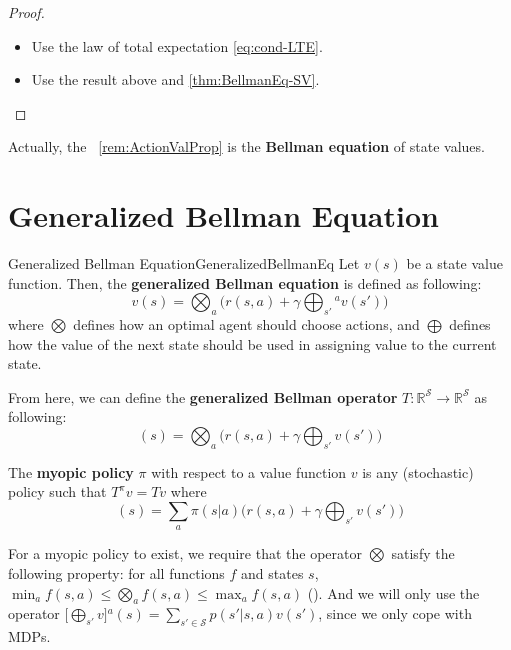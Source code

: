     \begin{proof}
        \begin{itemize}
            \item Use the law of total expectation \ref{eq:cond-LTE}.
            \item Use the result above and \ref{thm:BellmanEq-SV}.
        \end{itemize}
    \end{proof}
    Actually, the ~\ref{rem:ActionValProp} is the \textbf{Bellman equation} of state values.
\section{Generalized Bellman Equation}
    \begin{defn}{Generalized Bellman Equation}{GeneralizedBellmanEq}
        Let $v(s)$ be a state value function. Then, the \textbf{generalized Bellman equation} is defined as following:
        \begin{equation}
            v(s) = \bigotimes_a \Big(r(s, a) + \gamma \bigoplus_{s'}{}^a v(s') \Big) 
        \end{equation}
        where $\bigotimes$ defines how an optimal agent should choose actions, and $\bigoplus$ defines how the value of the next state should be used in assigning value to the current state.

        From here, we can define the \textbf{generalized Bellman operator} $T:\mathbb{R}^\mathcal{S} \to \mathbb{R}^\mathcal{S}$ as following:
        \begin{equation}
            [Tv](s) = \bigotimes_a \Big( r(s,a) + \gamma \bigoplus_{s'}v(s') \Big)
        \end{equation}

        The \textbf{myopic policy} $\pi$ with respect to a value function $v$ is any (stochastic) policy such that $T^\pi v = T v$ where
        \begin{equation}
            [T^\pi v](s) = \sum_a \pi(s|a) \Big( r(s, a) + \gamma \bigoplus_{s'}v(s') \Big)
        \end{equation}
    \end{defn}
    For a myopic policy to exist, we require that the operator $\bigotimes$ satisfy the following property: for all functions $f$ and states $s$,
    $\min_a f(s,a) \leq \bigotimes_a f(s,a) \leq \max_a f(s,a)$ (\cite{littman1996}).
    And we will only use the operator $\Big[\bigoplus_{s'} v\Big]{}^a(s) = \sum_{s' \in \mathcal{S}} p(s'|s,a) v(s')$, since we only cope with
    MDPs.
